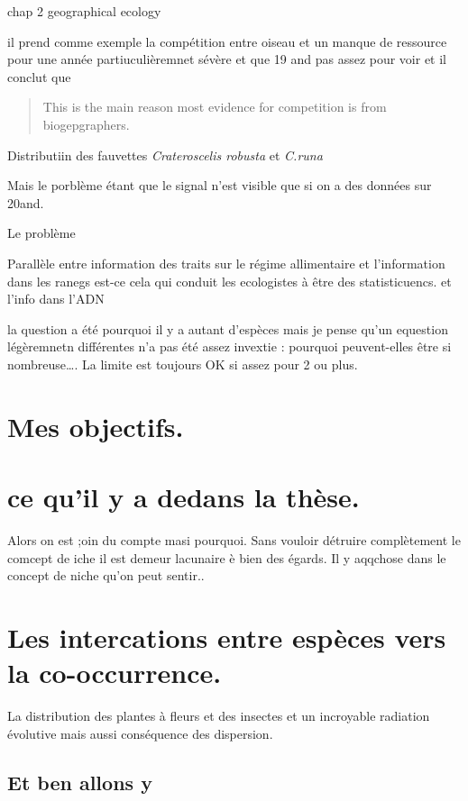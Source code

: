 chap 2 geographical ecology

il prend comme exemple la compétition entre oiseau et un manque de
ressource pour une année partiuculièremnet sévère et que 19 and pas
assez pour voir et il conclut que

\begin{quote}
This is the main reason most evidence for competition is from
biogepgraphers.
\end{quote}

Distributiin des fauvettes \emph{Crateroscelis robusta} et \emph{C.runa}

Mais le porblème étant que le signal n'est visible que si on a des
données sur 20and.

Le problème

Parallèle entre information des traits sur le régime allimentaire et
l'information dans les ranegs est-ce cela qui conduit les ecologistes à
être des statisticuencs. et l'info dans l'ADN

la question a été pourquoi il y a autant d'espèces mais je pense qu'un
equestion légèremnetn différentes n'a pas été assez invextie : pourquoi
peuvent-elles être si nombreuse\ldots{}. La limite est toujours OK si
assez pour 2 ou plus.

\section{Mes objectifs.}\label{mes-objectifs.}

\section{ce qu'il y a dedans la
thèse.}\label{ce-quil-y-a-dedans-la-thuxe8se.}

Alors on est ;oin du compte masi pourquoi. Sans vouloir détruire
complètement le comcept de iche il est demeur lacunaire è bien des
égards. Il y aqqchose dans le concept de niche qu'on peut sentir..

\section{Les intercations entre espèces vers la
co-occurrence.}\label{les-intercations-entre-espuxe8ces-vers-la-co-occurrence.}

La distribution des plantes à fleurs et des insectes et un incroyable
radiation évolutive mais aussi conséquence des dispersion.

\subsection{Et ben allons y}\label{et-ben-allons-y}

